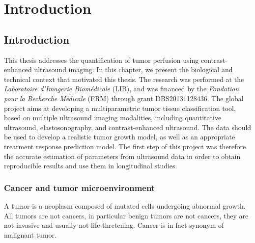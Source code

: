 \part*{Introduction}
\chapter{Introduction}\label{chapter:intro}
This thesis addresses the quantification of tumor perfusion using contrast-enhanced ultrasound imaging.
In this chapter, we present the biological and technical context that motivated this thesis.
The research was performed at the {\em Laboratoire d'Imagerie Biom\'edicale} (LIB), and was financed by the {\em Fondation pour la Recherche M\'edicale} (FRM) through grant DBS20131128436.
The global project aims at developing a multiparametric tumor tissue classification tool, based on multiple ultrasound imaging modalities, including quantitative ultrasound, elastosonography, and contrast-enhanced ultrasound.
The data should be used to develop a realistic tumor growth model, as well as an appropriate treatment response prediction model.
The first step of this project was therefore the accurate estimation of parameters from ultrasound data in order to obtain reproducible results and use them in longitudinal studies.

\section{Cancer and tumor microenvironment}
\label{sec:IntroCancer}
A tumor is a neoplasm composed of mutated cells undergoing abnormal growth.
All tumors are not cancers, in particular benign tumors are not cancers, they are not invasive and usually not life-thretening.
Cancer is in fact synonym of malignant tumor.

